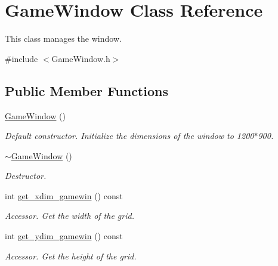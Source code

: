 \hypertarget{classGameWindow}{}\section{Game\+Window Class Reference}
\label{classGameWindow}


This class manages the window.  




{\ttfamily \#include $<$Game\+Window.\+h$>$}

\subsection*{Public Member Functions}
\begin{DoxyCompactItemize}
\item 
\hyperlink{classGameWindow_a81f2f6fea59b4723569c591756328163}{Game\+Window} ()\hypertarget{classGameWindow_a81f2f6fea59b4723569c591756328163}{}\label{classGameWindow_a81f2f6fea59b4723569c591756328163}

\begin{DoxyCompactList}\small\item\em Default constructor. Initialize the dimensions of the window to 1200$\ast$900. \end{DoxyCompactList}\item 
\hyperlink{classGameWindow_a55b071c0390e45c064a160c1e6baaa08}{$\sim$\+Game\+Window} ()\hypertarget{classGameWindow_a55b071c0390e45c064a160c1e6baaa08}{}\label{classGameWindow_a55b071c0390e45c064a160c1e6baaa08}

\begin{DoxyCompactList}\small\item\em Destructor. \end{DoxyCompactList}\item 
int \hyperlink{classGameWindow_a371fd4eb81a7d2df62b9d08fd1542ac5}{get\+\_\+xdim\+\_\+gamewin} () const 
\begin{DoxyCompactList}\small\item\em Accessor. Get the width of the grid. \end{DoxyCompactList}\item 
int \hyperlink{classGameWindow_ad00af4d0c50bfc7b1f8bc2dfb3a37f39}{get\+\_\+ydim\+\_\+gamewin} () const 
\begin{DoxyCompactList}\small\item\em Accessor. Get the height of the grid. \end{DoxyCompactList}\end{DoxyCompactItemize}


